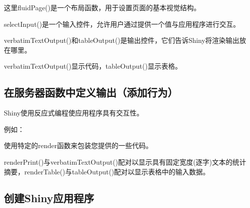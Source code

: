 \documentclass[
]{book}
\newenvironment{Shaded}{\begin{snugshade}}{\end{snugshade}}
\newcommand{\ControlFlowTok}[1]{\textcolor[rgb]{0.13,0.29,0.53}{\textbf{#1}}}
\newcommand{\FunctionTok}[1]{\textcolor[rgb]{0.00,0.00,0.00}{#1}}
\newcommand{\NormalTok}[1]{#1}
\newcommand{\OtherTok}[1]{\textcolor[rgb]{0.56,0.35,0.01}{#1}}
\newcommand{\SpecialCharTok}[1]{\textcolor[rgb]{0.00,0.00,0.00}{#1}}
\newcommand{\StringTok}[1]{\textcolor[rgb]{0.31,0.60,0.02}{#1}}
\begin{document}
这里fluidPage()是一个布局函数，用于设置页面的基本视觉结构。

selectInput()是一个输入控件，允许用户通过提供一个值与应用程序进行交互。

verbatimTextOutput()和tableOutput()是输出控件，它们告诉Shiny将渲染输出放在哪里。

verbatimTextOutput()显示代码，tableOutput()显示表格。

\hypertarget{ux5728ux670dux52a1ux5668ux51fdux6570ux4e2dux5b9aux4e49ux8f93ux51faux6dfbux52a0ux884cux4e3a}{%
\subsection{在服务器函数中定义输出（添加行为）}\label{ux5728ux670dux52a1ux5668ux51fdux6570ux4e2dux5b9aux4e49ux8f93ux51faux6dfbux52a0ux884cux4e3a}}

Shiny使用反应式编程使应用程序具有交互性。

例如：

\begin{Shaded}
\end{Shaded}

使用特定的render函数来包装您提供的一些代码。

renderPrint()与verbatimTextOutput()配对以显示具有固定宽度(逐字)文本的统计摘要，renderTable()与tableOutput()配对以显示表格中的输入数据。

\hypertarget{ux521bux5efashinyux5e94ux7528ux7a0bux5e8f}{%
\subsection{创建Shiny应用程序}\label{ux521bux5efashinyux5e94ux7528ux7a0bux5e8f}}
\end{document}
